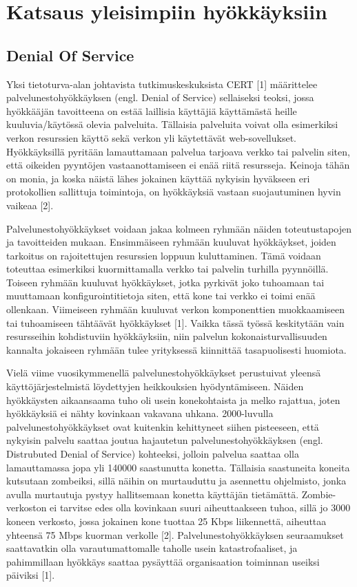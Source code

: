 
\chapter{Katsaus yleisimpiin hyökkäyksiin}

\section{Denial Of Service}

Yksi tietoturva-alan johtavista tutkimuskeskuksista CERT [1]
määrittelee palvelunestohyökkäyksen (engl. Denial of Service)
sellaiseksi teoksi, jossa hyökkääjän tavoitteena on estää laillisia
käyttäjiä käyttämästä heille kuuluvia/käytössä olevia
palveluita. Tällaisia palveluita voivat olla esimerkiksi verkon
resurssien käyttö sekä verkon yli käytettävät
web-sovellukset. Hyökkäyksillä pyritään lamauttamaan palvelua tarjoava
verkko tai palvelin siten, että oikeiden pyyntöjen vastaanottamiseen
ei enää riitä resursseja. Keinoja tähän on monia, ja koska näistä
lähes jokainen käyttää nykyisin hyväkseen eri protokollien sallittuja
toimintoja, on hyökkäyksiä vastaan suojautuminen hyvin vaikeaa [2].

Palvelunestohyökkäykset voidaan jakaa kolmeen ryhmään näiden
toteutustapojen ja tavoitteiden mukaan. Ensimmäiseen ryhmään kuuluvat
hyökkäykset, joiden tarkoitus on rajoitettujen resurssien loppuun
kuluttaminen. Tämä voidaan toteuttaa esimerkiksi kuormittamalla verkko
tai palvelin turhilla pyynnöillä. Toiseen ryhmään kuuluvat
hyökkäykset, jotka pyrkivät joko tuhoamaan tai muuttamaan
konfigurointitietoja siten, että kone tai verkko ei toimi enää
ollenkaan. Viimeiseen ryhmään kuuluvat verkon komponenttien
muokkaamiseen tai tuhoamiseen tähtäävät hyökkäykset [1]. Vaikka tässä
työssä keskitytään vain resursseihin kohdistuviin hyökkäyksiin, niin
palvelun kokonaisturvallisuuden kannalta jokaiseen ryhmään tulee
yrityksessä kiinnittää tasapuolisesti huomiota.

Vielä viime vuosikymmenellä palvelunestohyökkäykset perustuivat
yleensä käyttöjärjestelmistä löydettyjen heikkouksien
hyödyntämiseen. Näiden hyökkäysten aikaansaama tuho oli usein
konekohtaista ja melko rajattua, joten hyökkäyksiä ei nähty kovinkaan
vakavana uhkana. 2000-luvulla palvelunestohyökkäykset ovat kuitenkin
kehittyneet siihen pisteeseen, että nykyisin palvelu saattaa joutua
hajautetun palvelunestohyökkäyksen (engl. Distrubuted Denial of
Service) kohteeksi, jolloin palvelua saattaa olla lamauttamassa jopa
yli 140000 saastunutta konetta. Tällaisia saastuneita koneita
kutsutaan zombeiksi, sillä näihin on murtauduttu ja asennettu
ohjelmisto, jonka avulla murtautuja pystyy hallitsemaan konetta
käyttäjän tietämättä. Zombie-verkoston ei tarvitse edes olla kovinkaan
suuri aiheuttaakseen tuhoa, sillä jo 3000 koneen verkosto, jossa
jokainen kone tuottaa 25 Kbps liikennettä, aiheuttaa yhteensä 75 Mbps
kuorman verkolle [2]. Palvelunestohyökkäyksen seuraamukset
saattavatkin olla varautumattomalle taholle usein katastrofaaliset, ja
pahimmillaan hyökkäys saattaa pysäyttää organisaation toiminnan
useiksi päiviksi [1].

